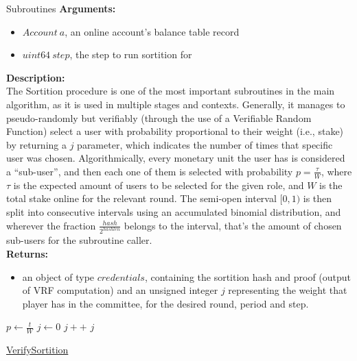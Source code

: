 \documentclass[10pt,a4paper]{article}
\begin{document}
\begin{section}{Subroutines}
\noindent \textbf{Arguments:}
\begin{itemize}
    \item $Account \ a$, an online account's balance table record
    \item $uint64 \ step$, the step to run sortition for
\end{itemize}

\noindent \textbf{Description:}\\
The Sortition procedure is one of the most important subroutines in the main algorithm, as it is 
used in multiple stages and contexts.
Generally, it manages to pseudo-randomly but verifiably (through the use of a Verifiable Random 
Function) select a user with probability proportional
to their weight (i.e., stake) by returning a $j$ parameter, which indicates the number of times that 
specific user was chosen.
Algorithmically, every monetary unit the user has is considered a ``sub-user'', and then each one 
of them is selected with probability $p = \frac{\tau}{W}$,
where $\tau$ is the expected amount of users to be selected for the given role, and $W$ is the total
stake online for the relevant round.
The semi-open interval $[0,1)$ is then split into consecutive intervals using an accumulated 
binomial distribution, and wherever the fraction $\frac{hash}{2^{hashlen}}$
belongs to the interval, that's the amount of chosen sub-users for the subroutine caller.\\

\noindent \textbf{Returns:}
\begin{itemize}
    \item an object of type $credentials$, containing the sortition hash and proof (output of VRF
    computation) and an unsigned integer $j$ representing the weight that player has in the committee,
    for the desired round, period and step.
  \end{itemize}



\begin{algorithm}[H]
    \begin{algorithmic}[1]
        \State $p \gets \frac{t}{W}$
        \State $j \gets 0$
        \While{$\frac{hash}{2^{hashlen}} \notin [\sum_{k=0}^j\mathsf{B}(k;w,p), \sum_{k=0}^{j+1}\mathsf{B}(k;w,p))$}
            \State $j++$
        \EndWhile
        \Return $j$
    \EndFunction
    \end{algorithmic}
    \caption{\underline{VerifySortition}}
\end{algorithm}


\end{section}
\end{document}
